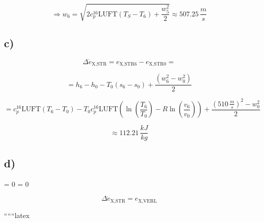 \[
\Rightarrow w_6 = \sqrt{2 c_p^{16} \text{LUFT} \left( T_S - T_6 \right) + \frac{w_5^2}{2}} \approx 507.25 \, \frac{m}{s}
\]

\subsection*{c)}

\[
\Delta \dot{e}_{\text{X,STR}} = e_{\text{X,STR6}} - e_{\text{X,STR0}} = 
\]

\[
= h_6 - h_0 - T_0 (s_6 - s_0) + \frac{(w_6^2 - w_0^2)}{2}
\]

\[
= c_p^{16} \text{LUFT} (T_6 - T_0) - T_0 c_p^{16} \text{LUFT} \left( \ln \left( \frac{T_6}{T_0} \right) - R \ln \left( \frac{v_6}{v_0} \right) \right) + \frac{(510 \, \frac{m}{s})^2 - w_0^2}{2}
\]

\[
\approx 112.21 \, \frac{kJ}{kg}
\]

\subsection*{d)}

 \quad {} = 0 \quad {} = 0

\[
\Delta \dot{e}_{\text{X,STR}} = e_{\text{X,VERL}}
\]

``````latex



